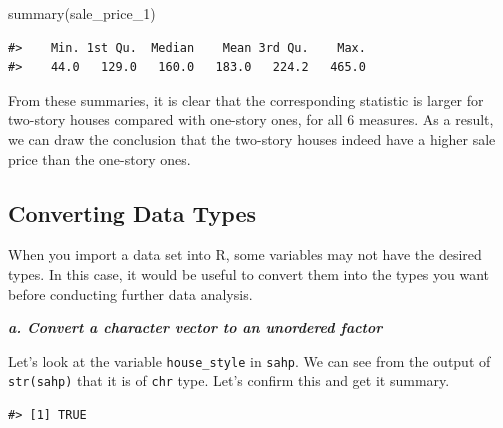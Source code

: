 \documentclass[
]{book}
\newenvironment{Shaded}{\begin{snugshade}}{\end{snugshade}}
\newcommand{\FunctionTok}[1]{\textcolor[rgb]{0.00,0.00,0.00}{#1}}
\newcommand{\NormalTok}[1]{#1}
\newcommand{\SpecialCharTok}[1]{\textcolor[rgb]{0.00,0.00,0.00}{#1}}
\begin{document}
\begin{Shaded}
\begin{Highlighting}[]
\FunctionTok{summary}\NormalTok{(sale\_price\_1)}
\end{Highlighting}
\end{Shaded}

\begin{verbatim}
#>    Min. 1st Qu.  Median    Mean 3rd Qu.    Max. 
#>    44.0   129.0   160.0   183.0   224.2   465.0
\end{verbatim}

From these summaries, it is clear that the corresponding statistic is larger for two-story houses compared with one-story ones, for all 6 measures. As a result, we can draw the conclusion that the two-story houses indeed have a higher sale price than the one-story ones.

\hypertarget{converting-data-types}{%
\subsection{Converting Data Types}\label{converting-data-types}}

When you import a data set into R, some variables may not have the desired types. In this case, it would be useful to convert them into the types you want before conducting further data analysis.

\textbf{\emph{a. Convert a character vector to an unordered factor}}

Let's look at the variable \texttt{house\_style} in \texttt{sahp}. We can see from the output of \texttt{str(sahp)} that it is of \texttt{chr} type. Let's confirm this and get it summary.

\begin{Shaded}
\end{Shaded}

\begin{verbatim}
#> [1] TRUE
\end{verbatim}

\begin{Shaded}
\end{Shaded}
\end{document}

